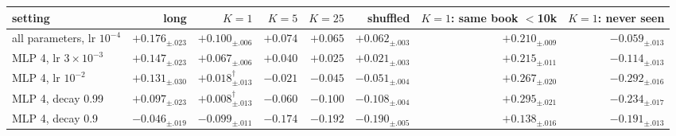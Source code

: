 \begin{tabular}{lrrrrrrr}
\toprule
setting & long & $K=1$ & $K=5$ & $K=25$ & shuffled & $K=1$: same book $<$10k & $K=1$: never seen \\
\midrule
all parameters, lr $10^{-4}$ & $+0.176_{\pm .023}$ & $+0.100_{\pm .006}$ & $+0.074$ & $+0.065$ & $+0.062_{\pm .003}$ & $+0.210_{\pm .009}$ & $-0.059_{\pm .013}$ \\
MLP 4, lr $3\!\times\!10^{-3}$ & $+0.147_{\pm .023}$ & $+0.067_{\pm .006}$ & $+0.040$ & $+0.025$ & $+0.021_{\pm .003}$ & $+0.215_{\pm .011}$ & $-0.114_{\pm .013}$ \\
MLP 4, lr $10^{-2}$ & $+0.131_{\pm .030}$ & $+0.018_{\pm .013}^{\dagger}$ & $-0.021$ & $-0.045$ & $-0.051_{\pm .004}$ & $+0.267_{\pm .020}$ & $-0.292_{\pm .016}$ \\
MLP 4, decay 0.99 & $+0.097_{\pm .023}$ & $+0.008_{\pm .013}^{\dagger}$ & $-0.060$ & $-0.100$ & $-0.108_{\pm .004}$ & $+0.295_{\pm .021}$ & $-0.234_{\pm .017}$ \\
MLP 4, decay 0.9 & $-0.046_{\pm .019}$ & $-0.099_{\pm .011}$ & $-0.174$ & $-0.192$ & $-0.190_{\pm .005}$ & $+0.138_{\pm .016}$ & $-0.191_{\pm .013}$ \\
\bottomrule
\end{tabular}

